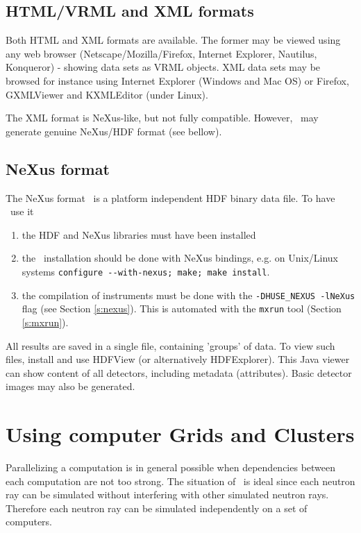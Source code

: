 \subsection{HTML/VRML and XML formats}
  

Both HTML and XML formats are available. The former may be viewed using any web browser (Netscape/Mozilla/Firefox, Internet Explorer, Nautilus, Konqueror) - showing data sets as VRML objects. XML data sets may be browsed for instance using Internet Explorer (Windows and Mac OS) or Firefox, GXMLViewer and KXMLEditor (under Linux).

The XML format is NeXus-like, but not fully compatible. However, \MCX\ may generate genuine NeXus/HDF format (see bellow).

\subsection{NeXus format}
  
\label{r:nexus}

The NeXus format~\cite{nexus_webpage} is a platform independent HDF binary data file. To have \MCX\ use it
\begin{enumerate}
\item the HDF and NeXus libraries must have been installed
\item the \MCX\ installation should be done with NeXus bindings, e.g. on Unix/Linux systems \verb+configure --with-nexus; make; make install+.
\item  the compilation of instruments must be done with the \verb+-DHUSE_NEXUS -lNeXus+ flag (see Section \ref{s:nexus}). This is automated with the \verb+mxrun+ tool (Section \ref{s:mxrun}).
\end{enumerate}
All results are saved in a single file, containing 'groups' of data. To view such files, install and use HDFView (or alternatively HDFExplorer). This Java viewer can show content of all detectors, including metadata (attributes). Basic detector images may also be generated.

\section{Using computer Grids and Clusters}
\label{s:run-mpi}

Parallelizing a computation is in general possible when dependencies between
  each computation are not too strong. The situation of \MCX\ is
  ideal since each neutron ray can be simulated without interfering with
  other simulated neutron rays. Therefore each neutron ray can be simulated
  independently on a set of computers.
  
